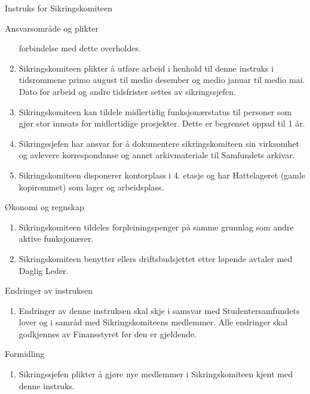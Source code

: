 \begin{instruks*}{Instruks for Sikringskomiteen}
\begin{instruksledd}{Ansvarsområde og plikter}
\begin{enumerate}
                forbindelse med dette overholdes.
            \item Sikringskomiteen plikter å utføre arbeid i henhold til denne instruks i
                tidsrommene primo august til medio
                desember og medio januar til medio mai. Dato for arbeid og andre
                tidsfrister settes av sikringssjefen.
            \item Sikringskomiteen kan tildele midlertidig funksjonærstatus til personer
                som gjør stor innsats for midlertidige
                prosjekter. Dette er begrenset oppad til 1 år.
            \item Sikringssjefen har ansvar for å dokumentere sikringskomiteen sin
                virksomhet og avlevere korrespondanse og annet arkivmateriale til Samfundets arkivar.
	    \item Sikringskomiteen disponerer kontorplass i 4. etasje og har Hattelageret (gamle
		kopirommet) som lager og arbeidsplass.
        \end{enumerate}
    \end{instruksledd}

    \begin{instruksledd}{Økonomi og regnskap}
        \begin{enumerate}
            \item Sikringskomiteen tildeles forpleiningspenger på samme grunnlag som andre aktive
                funksjonærer.
            \item Sikringskomiteen benytter ellers driftsbudsjettet etter løpende avtaler med
                Daglig Leder.
        \end{enumerate}
    \end{instruksledd}

    \begin{instruksledd}{ Endringer av instruksen}
        \begin{enumerate}
            \item Endringer av denne instruksen skal skje i samsvar med Studentersamfundets lover
                og i samråd med
                Sikringskomiteens medlemmer. Alle endringer skal godkjennes av Finansstyret før
                den er gjeldende.
        \end{enumerate}
    \end{instruksledd}

    \begin{instruksledd}{Formidling}
        \begin{enumerate}
            \item Sikringssjefen plikter å gjøre nye medlemmer i Sikringskomiteen kjent med denne
                instruks.
        \end{enumerate}
    \end{instruksledd}

\end{instruks*}





